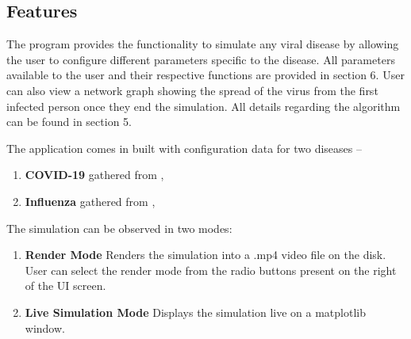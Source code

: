 \documentclass[11pt]{article}
\begin{document}
\subsection{Features}

The program provides the functionality to simulate any viral disease by allowing the user to configure different parameters specific to the disease. All parameters available to the user and their respective functions are provided in section 6. User can also view a network graph showing the spread of the virus from the first infected person once they end the simulation. 
All details regarding the algorithm can be found in section 5. 

The application comes in built with configuration data for two diseases – 
\begin{enumerate}
    \item \textbf{COVID-19} gathered from \cite{cov_ref},\cite{k_val}
    \item \textbf{Influenza} gathered from \cite{influ_ref},\cite{k_val}
\end{enumerate}

The simulation can be observed in two modes:
\begin{enumerate}
    \item \textbf{Render Mode} Renders the simulation into a .mp4 video file on the disk. User can select the render mode from the radio buttons present on the right of the UI screen. 
    \item \textbf{Live Simulation Mode} Displays the simulation live on a matplotlib window. 
\end{enumerate}
\end{document}
